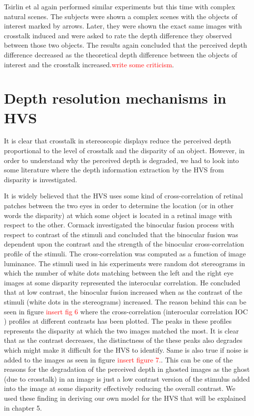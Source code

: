 Tsirlin et al \cite{tsirlin2012crosstalk} again performed similar experiments but this time with complex natural scenes. The subjects were shown a complex scenes with the objects of interest marked by arrows. Later, they were shown the exact same images with crosstalk induced and were asked to rate the depth difference they observed between those two objects. The results again concluded that the perceived depth difference decreased as the theoretical depth difference between the objects of interest and the crosstalk increased.\textcolor{red}{write some criticism}.

\section{Depth resolution mechanisms in HVS}
It is clear that crosstalk in stereoscopic displays reduce the perceived depth proportional to the level of crosstalk and the disparity of an object. However, in order to understand why the perceived depth is degraded, we had to look into some literature where the depth information extraction by the HVS from disparity is investigated.

It is widely believed that the HVS uses some kind of cross-correlation of retinal patches between the two eyes in order to determine the location (or in other words the disparity) at which some object is located in a retinal image with respect to the other. Cormack \cite{cormack1991interocular} investigated the binocular fusion process with respect to contrast of the stimuli and concluded that the binocular fusion was dependent upon the contrast and the strength of the binocular cross-correlation profile of the stimuli. The cross-correlation was computed as a function of image luminance. The stimuli used in his experiments were random dot stereograms in which the number of white dots matching between the left and the right eye images at some disparity represented the interocular correlation. He concluded that at low contrast, the binocular fusion increased when as the contrast of the stimuli (white dots in the stereograms) increased. The reason behind this can be seen in figure \textcolor{red}{insert fig 6 } where the cross-correlation (interocular correlation IOC ) profiles at different contrasts has been plotted. The peaks in these profiles represents the disparity at which the two images matched the most. It is clear that as the contrast decreases, the distinctness of the these peaks also degrades which might make it difficult for the HVS to identify. Same is also true if noise is added to the images as seen in figure \textcolor{red}{insert figure 7.}. This can be one of the reasons for the degradation of the perceived depth in ghosted images as the ghost (due to crosstalk) in an image is just a low contrast version of the stimulus added into the image at some disparity effectively reducing the overall contrast. We used these finding in deriving our own model for the HVS that will be explained in chapter 5.

